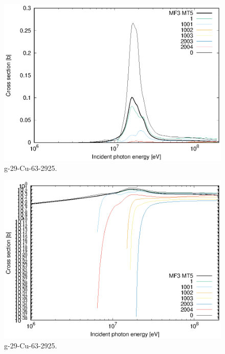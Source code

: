 \begin{figure}
 \includegraphics[width=\linewidth]{eps/g_29-Cu-63_2925.eps}
  \caption{g-29-Cu-63-2925.}
\end{figure}
\begin{figure}
 \includegraphics[width=\linewidth]{eps-log/g_29-Cu-63_2925.eps}
 \caption{g-29-Cu-63-2925.}
\end{figure}
\newpage \clearpage

